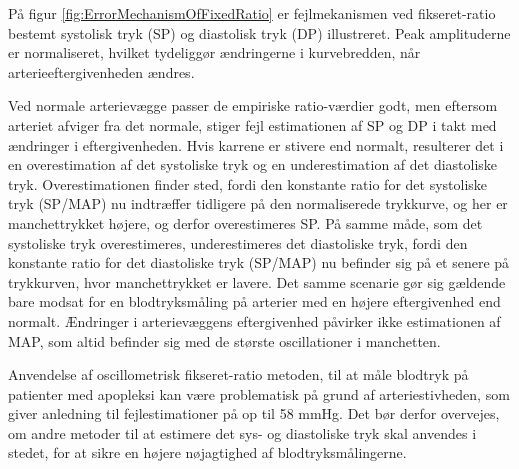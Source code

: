 \begin{minipage}[t]{0.5\textwidth}
På figur \ref{fig:ErrorMechanismOfFixedRatio} er fejlmekanismen ved fikseret-ratio bestemt systolisk tryk (SP) og diastolisk tryk (DP) illustreret. Peak amplituderne er normaliseret, hvilket tydeliggør ændringerne i kurvebredden, når arterieeftergivenheden ændres. 

Ved normale arterievægge passer de empiriske ratio-værdier godt, men eftersom arteriet afviger fra det normale, stiger fejl estimationen af SP og DP i takt med ændringer i eftergivenheden. Hvis karrene er stivere end normalt, resulterer det i en overestimation af det systoliske tryk og en underestimation af det diastoliske tryk. Overestimationen finder sted, fordi den konstante ratio for det systoliske tryk (SP/MAP) nu indtræffer tidligere på den normaliserede trykkurve, og her er manchettrykket højere, og derfor overestimeres SP. På samme måde, som det systoliske tryk overestimeres, underestimeres det diastoliske tryk, fordi den konstante ratio for det diastoliske tryk (SP/MAP) nu befinder sig på et senere på trykkurven, hvor manchettrykket er lavere. Det samme scenarie gør sig gældende bare modsat for en blodtryksmåling på arterier med en højere eftergivenhed end normalt. Ændringer i arterievæggens eftergivenhed påvirker ikke estimationen af MAP, som altid befinder sig med de største oscillationer i manchetten.

Anvendelse af oscillometrisk fikseret-ratio metoden, til at måle blodtryk på patienter med apopleksi kan være problematisk på grund af arteriestivheden, som giver anledning til fejlestimationer på op til 58 mmHg. Det bør derfor overvejes, om andre metoder til at estimere det sys- og diastoliske tryk skal anvendes i stedet, for at sikre en højere nøjagtighed af blodtryksmålingerne.
\end{minipage}
